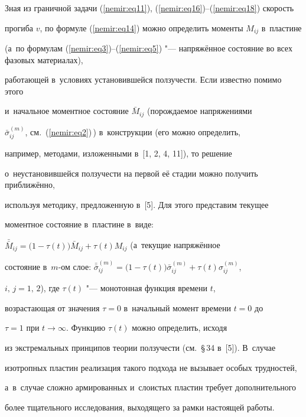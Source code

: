 \begin{remark}[2] Зная из граничной задачи (\ref{nemir:eq11}), (\ref{nemir:eq16})--(\ref{nemir:eq18}) скорость 

прогиба $v$, по формуле (\ref{nemir:eq14}) можно определить моменты $M_{ij} $ в~пластине 

(а~по формулам (\ref{nemir:eq3})--(\ref{nemir:eq5}) "--- напряжённое состояние во всех фазовых материалах), 

работающей в~условиях установившейся ползучести. Если известно помимо этого 

и~начальное моментное состояние $\bar {M}_{ij} $ (порождаемое напряжениями 

$\bar {\sigma }_{ij}^{(m)} $, см.~(\ref{nemir:eq2})\,) в~конструкции (его можно определить, 

например, методами, изложенными в~[1, 2, 4, 11]), то решение 

о~неустановившейся ползучести на первой её стадии можно получить приближённо, 

используя методику, предложенную в~[5]. Для этого представим текущее 

моментное состояние в~пластине в~виде: 

$\bar {\bar {M}}_{ij} = \bigl( 1 - \tau (t)\bigr)\bar {M}_{ij} + \tau (t)M_{ij} $ (а~текущие напряжённое 

состояние в~$m$-ом слое: $\bar {\bar {\sigma }}_{ij}^{(m)} = \bigl(1 - \tau (t)\bigr)\bar {\sigma }_{ij}^{(m)} + 

\tau (t)\sigma _{ij}^{(m)} $, 

$i,\,j = 1,\,2$), где $\tau (t)$ "--- монотонная функция времени $t$, 

возрастающая от значения $\tau = 0$ в~начальный момент времени $t = 0$ до 

$\tau = 1$ при $t \to \infty $. Функцию $\tau (t)$ можно определить, исходя 

из экстремальных принципов теории ползучести (см.~\S\,34 в~[5]). В~случае 

изотропных пластин реализация такого подхода не вызывает особых трудностей, 

а~в~случае сложно армированных и~слоистых пластин требует дополнительного 

более тщательного исследования, выходящего за рамки настоящей работы.

\end{remark}



\vspace{-5mm}

